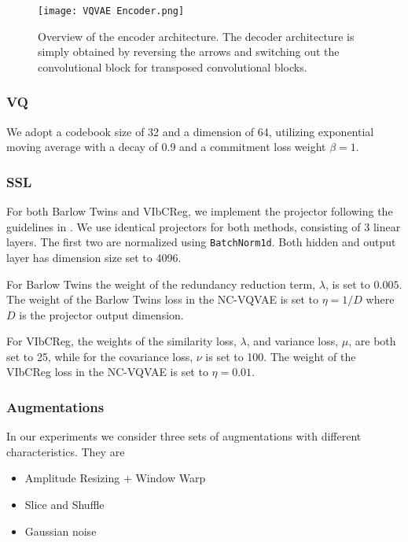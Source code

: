 \documentclass[../../thesis.tex]{subfiles}
\begin{document}
\begin{figure}[h]
    
    \texttt{[image: VQVAE Encoder.png]}
    \centering
    \caption{Overview of the encoder architecture. The decoder architecture is simply obtained by reversing the arrows and switching out the convolutional block for transposed convolutional blocks.}
    \label{fig:VQVAE Encoder}
\end{figure}

\subsubsection{VQ}

We adopt a codebook size of 32 and a dimension of 64, utilizing exponential moving average with a decay of 0.9 and a commitment loss weight $\beta = 1$.

\subsubsection{SSL}
For both Barlow Twins and VIbCReg, we implement the projector following the guidelines in \cite{lee2024computer}. 
We use identical projectors for both methods, consisting of 3 linear layers. The first two are normalized using \texttt{BatchNorm1d}. Both hidden and output layer has dimension size set to 4096.\newline

For Barlow Twins the weight of the redundancy reduction term, $\lambda$, is set to $0.005$. The weight of the Barlow Twins loss in the NC-VQVAE is set to $\eta = 1/D$ where $D$ is the projector output dimension.\newline

For VIbCReg, the weights of the similarity loss, $\lambda$, and variance loss, $\mu$, are both set to 25, while for the covariance loss, $\nu$ is set to 100. The weight of the VIbCReg loss in the NC-VQVAE is set to $\eta = 0.01$.\newline


\subsubsection{Augmentations}
In our experiments we consider three sets of augmentations with different characteristics. They are
\begin{itemize}
    \item Amplitude Resizing + Window Warp
    \item Slice and Shuffle
    \item Gaussian noise
\end{itemize}
\end{document}
